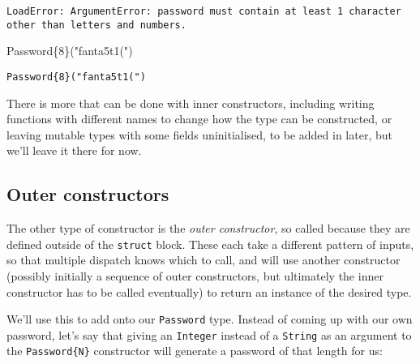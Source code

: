 \documentclass[
  letterpaper,
  DIV=11,
  numbers=noendperiod]{scrreprt}
\newenvironment{Shaded}{\begin{snugshade}}{\end{snugshade}}
\newcommand{\DataTypeTok}[1]{\textcolor[rgb]{0.68,0.00,0.00}{#1}}
\newcommand{\FunctionTok}[1]{\textcolor[rgb]{0.28,0.35,0.67}{#1}}
\newcommand{\NormalTok}[1]{\textcolor[rgb]{0.00,0.23,0.31}{#1}}
\newcommand{\StringTok}[1]{\textcolor[rgb]{0.13,0.47,0.30}{#1}}
\begin{document}
\begin{verbatim}
LoadError: ArgumentError: password must contain at least 1 character other than letters and numbers.
\end{verbatim}

\begin{Shaded}
\begin{Highlighting}[]
\FunctionTok{Password}\DataTypeTok{\{8\}}\NormalTok{(}\StringTok{"fanta5t1("}\NormalTok{)}
\end{Highlighting}
\end{Shaded}

\begin{verbatim}
Password{8}("fanta5t1(")
\end{verbatim}

There is more that can be done with inner constructors, including
writing functions with different names to change how the type can be
constructed, or leaving mutable types with some fields uninitialised, to
be added in later, but we'll leave it there for now.

\hypertarget{outer-constructors}{%
\subsection{Outer constructors}\label{outer-constructors}}

The other type of constructor is the \emph{outer constructor}, so called
because they are defined outside of the \texttt{struct} block. These
each take a different pattern of inputs, so that multiple dispatch knows
which to call, and will use another constructor (possibly initially a
sequence of outer constructors, but ultimately the inner constructor has
to be called eventually) to return an instance of the desired type.

We'll use this to add onto our \texttt{Password} type. Instead of coming
up with our own password, let's say that giving an \texttt{Integer}
instead of a \texttt{String} as an argument to the
\texttt{Password\{N\}} constructor will generate a password of that
length for us:
\end{document}
